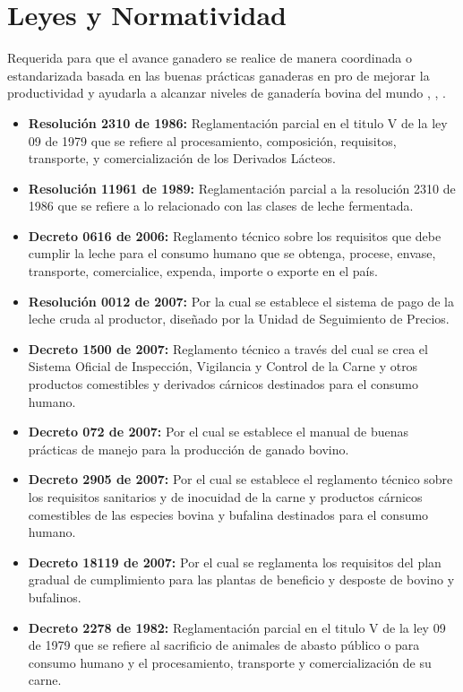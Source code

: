 \section{Leyes y Normatividad}  \label{leyes}
Requerida para que el avance ganadero se realice de manera coordinada o estandarizada basada en las buenas prácticas ganaderas en pro de mejorar la productividad y ayudarla a alcanzar niveles de ganadería bovina del mundo \cite{invima}, \cite{leylacteos}, \cite{minsaludleche}. 
\begin{itemize}
	\item \textbf{Resolución 2310 de 1986:} Reglamentación parcial en el titulo V de la ley 09 de 1979 que se refiere al procesamiento, composición, requisitos, transporte, y comercialización de los Derivados Lácteos.
	\item \textbf{Resolución 11961 de 1989:} Reglamentación parcial a la resolución 2310 de 1986 que se refiere a lo relacionado con las clases de leche fermentada.
	\item \textbf{Decreto 0616 de 2006:} Reglamento técnico sobre los requisitos que debe cumplir la leche para el consumo humano que se obtenga, procese, envase, transporte, comercialice, expenda, importe o exporte en el país.
	\item \textbf{Resolución 0012 de 2007:} Por la cual se establece el sistema de pago de la leche cruda al productor, diseñado por la Unidad de Seguimiento de Precios.
	\item \textbf{Decreto 1500 de 2007:} Reglamento técnico a través del cual se crea el Sistema Oficial de Inspección, Vigilancia y Control de la Carne y otros productos comestibles y derivados cárnicos destinados para el consumo humano.
	\item \textbf{Decreto 072 de 2007:} Por el cual se establece el manual de buenas prácticas de manejo para la producción de ganado bovino.
	\item \textbf{Decreto 2905 de 2007:} Por el cual se establece el reglamento técnico sobre los requisitos sanitarios y de inocuidad de la carne y productos cárnicos comestibles de las especies bovina y bufalina destinados para el consumo humano.
	\item \textbf{Decreto 18119 de 2007:} Por el cual se reglamenta los requisitos del plan gradual de cumplimiento para  las plantas de beneficio y desposte de bovino y bufalinos.
	\item \textbf{Decreto 2278 de 1982:} Reglamentación parcial en el titulo V de la ley 09 de 1979 que se refiere al sacrificio de animales de abasto público o para consumo humano y el procesamiento, transporte y comercialización de su carne.

\end{itemize}


